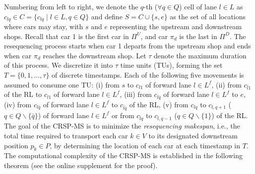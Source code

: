 \documentclass[12pt]{article}
\begin{document}
Numbering from left to right, we denote the $q$-th ($\forall q\in Q$) cell of lane $l\in L$ as $c_{lq}\in C=\{c_{lq}\mid l\in L, q\in Q\}$ and define $S=C\cup \{s,e\}$ as the set of all locations where cars may stay, with $s$ and $e$ representing the upstream and downstream shops. Recall that car 1 is the first car in $\Pi^{U}$, and car $\pi_{d}$ is the last in $\Pi^{D}$. The resequencing process starts when car 1 departs from the upstream shop and ends when car $\pi_{d}$ reaches the downstream shop. Let $\tau$ denote the maximum duration of this process. We discretize it into $\tau$ time units (TUs), forming the set $T=\{0,1,\dots,\tau\}$ of discrete timestamps. Each of the following five movements is assumed to consume one TU: \textup{(i)} from $s$ to $c_{l1}$ of forward lane $l\in L^f$, \textup{(ii)} from $c_{\bar{l}1}$ of the RL to $c_{l1}$ of forward lane $l\in L^f$, (iii) from $c_{l\bar{q}}$ of forward lane $l\in L^f$ to $e$, \textup{(iv)} from $c_{l\bar{q}}$ of forward lane $l\in L^f$ to $c_{\bar{l}\bar{q}}$ of the RL, \textup{(v)} from $c_{lq}$ to $c_{l,q+1}$ ($q\in Q\backslash \{\bar{q}\}$) of forward lane $l\in L^f$ or from $c_{\bar{l}q}$ to $c_{\bar{l},q-1}$ ($q\in Q\backslash\{1\}$) of the RL. %
The goal of the CRSP-MS is to minimize the \textit{resequencing makespan}, i.e., the total time required to transport each car $k\in V$ to its designated downstream position $p_k\in P$, by determining the location of each car at each timestamp in $T$. The computational complexity of the CRSP-MS is established in the following theorem (see the online supplement for the proof).


\end{document}
